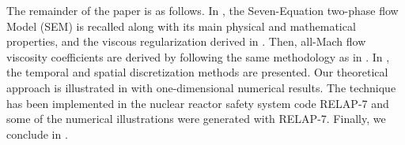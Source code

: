 \documentclass[preprint,10pt]{elsarticle}
\begin{document}
%
%
The remainder of the paper is as follows. In , the Seven-Equation two-phase flow Model (SEM) is recalled along with its main 
physical and mathematical properties, and the viscous regularization derived in \cite{Marco_paper_sem}. Then, all-Mach flow viscosity coefficients are derived 
by following the same methodology as in \cite{DelchiniCompFluid2014-euler}. In , the temporal and spatial discretization methods are presented. 
Our theoretical approach is illustrated in  with one-dimensional numerical results. The technique has been implemented in the nuclear 
reactor safety system code RELAP-7 \cite{Berry_2014} and some of the numerical illustrations were generated with RELAP-7.
Finally, we conclude in .
%

%
\end{document}
